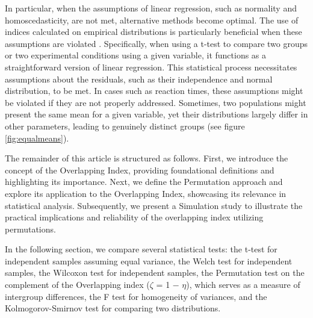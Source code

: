 \documentclass[twocolumn]{article}
\begin{document}
\vspace{0.2cm}
In particular, when the assumptions of linear regression, such as normality and homoscedasticity, are not met, alternative methods become optimal. The use of indices calculated on empirical distributions is particularly beneficial when these assumptions are violated \cite{pastore2015analisi}. Specifically, when using a t-test to compare two groups or two experimental conditions using a given variable, it functions as a straightforward version of linear regression. This statistical process necessitates assumptions about the residuals, such as their independence and normal distribution, to be met. In cases such as reaction times, these assumptions might be violated if they are not properly addressed. Sometimes, two populations might present the same mean for a given variable, yet their distributions largely differ in other parameters, leading to genuinely distinct groups (see figure \ref{fig:equalmeans}).

\vspace{0.2cm}
The remainder of this article is structured as follows. First, we introduce the concept of the Overlapping Index, providing foundational definitions and highlighting its importance. Next, we define the Permutation approach and explore its application to the Overlapping Index, showcasing its relevance in statistical analysis. Subsequently, we present a Simulation study to illustrate the practical implications and reliability of the overlapping index utilizing permutations.

In the following section, we compare several statistical tests: the t-test for independent samples assuming equal variance, the Welch test for independent samples, the Wilcoxon test for independent samples, the Permutation test on the complement of the Overlapping index ($\zeta$ = 1 − $\eta$), which serves as a measure of intergroup differences, the F test for homogeneity of variances, and the Kolmogorov-Smirnov test for comparing two distributions.
\end{document}
